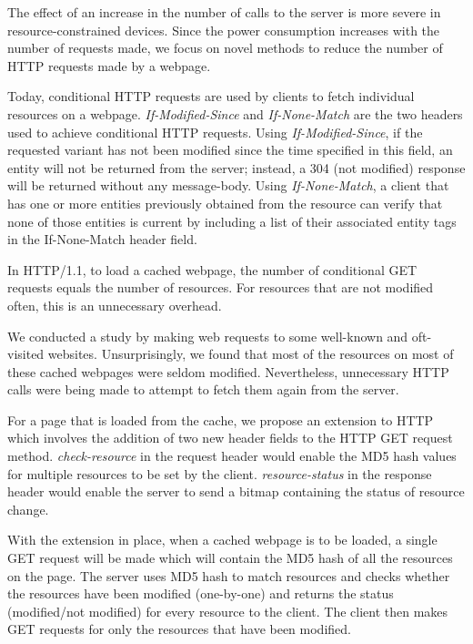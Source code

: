 \documentclass[9pt]{sigplan-proc-varsize}
\begin{document}
The effect of an increase in the number of calls to the server is more severe in resource-constrained devices. Since the power consumption increases with the number of requests made, we focus on novel methods to reduce the number of HTTP requests made by a webpage.

Today, conditional HTTP requests are used by clients to fetch individual resources on a webpage.  {\it If-Modified-Since} and {\it If-None-Match} are the two headers used to achieve conditional HTTP requests. Using {\it If-Modified-Since}, if the requested variant has not been modified since the time specified in this field, an entity will not be returned from the server; instead, a 304 (not modified) response will be returned without any message-body. Using {\it If-None-Match}, a client that has one or more entities previously obtained from the resource can verify that none of those entities is current by including a list of their associated entity tags in the If-None-Match header field.

In HTTP/1.1, to load a cached webpage, the number of conditional GET requests equals the number of resources. For resources that are not modified often, this is an unnecessary overhead.

We conducted a study by making web requests to some well-known and oft-visited websites. Unsurprisingly, we found that most of the resources on most of these cached webpages were seldom modified. Nevertheless, unnecessary HTTP calls were being made to attempt to fetch them again from the server.

For a page that is loaded from the cache, we propose an extension to HTTP which involves the addition of two new header fields to the HTTP GET request method. {\it check-resource} in the request header would enable the MD5 hash values for multiple resources to be set by the client. {\it resource-status} in the response header would enable the server to send a bitmap containing the status of resource change.

With the extension in place, when a cached webpage is to be loaded, a single GET request will be made which will contain the MD5 hash of all the resources on the page. The server uses MD5 hash to match resources and checks whether the resources have been modified (one-by-one) and returns the status (modified/not modified) for every resource to the client. The client then makes GET requests for only the resources that have been modified.
\end{document}
